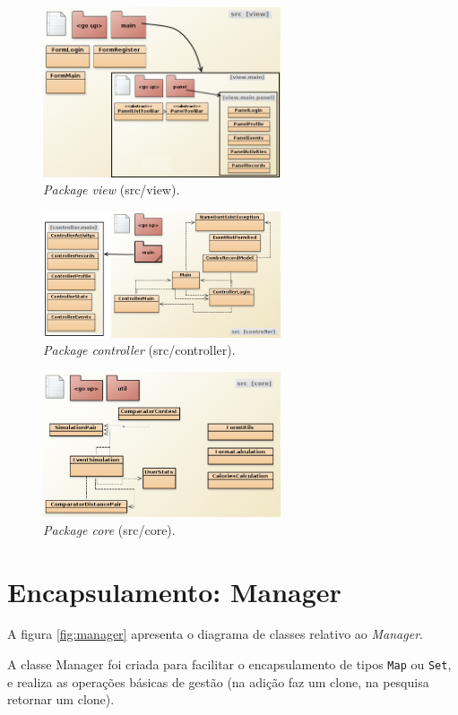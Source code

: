 \documentclass[a4paper,10pt]{report}
\begin{document}
\begin{figure}
\centering
\includegraphics[width=7cm]{view.png}
\caption{\emph{Package view} (src/view).}
\label{fig:view}
\end{figure}

\begin{figure}
\centering
\includegraphics[width=7cm]{controller.png}
\caption{\emph{Package controller} (src/controller).}
\label{fig:controller}
\end{figure}

\begin{figure}
\centering
\includegraphics[width=7cm]{core.png}
\caption{\emph{Package core} (src/core).}
\label{fig:core}
\end{figure}

\section{Encapsulamento: Manager}
\label{sec:manager}
A figura \ref{fig:manager} apresenta o diagrama de classes relativo ao \emph{Manager}.

A classe Manager foi criada para facilitar o encapsulamento de tipos \verb!Map! ou \verb!Set!, e realiza as operações básicas de gestão 
(na adição faz um clone, na pesquisa retornar um clone).
\end{document}
